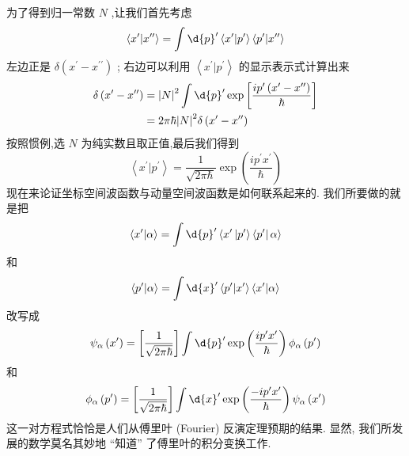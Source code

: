 为了得到归一常数 $N$ ,让我们首先考虑
\begin{equation}
	\left\langle {{x}^{\prime } | {x}^{\prime \prime }}\right\rangle = \int \d{p}^{\prime }\left\langle {{x}^{\prime } | {p}^{\prime }}\right\rangle \left\langle {{p}^{\prime } | {x}^{\prime \prime }}\right\rangle
\end{equation}
左边正是 $\delta \left( {{x}^{\prime } - {x}^{\prime \prime }}\right)$ ; 右边可以利用 $\left\langle {{x}^{\prime } | {p}^{\prime }}\right\rangle$ 的显示表示式计算出来
\begin{equation}
	\begin{aligned}
		\delta \left( {{x}^{\prime } - {x}^{\prime \prime }}\right) &= {\left| N\right| }^{2}\int \d{p}^{\prime }\exp \left\lbrack \frac{i{p}^{\prime }\left( {{x}^{\prime } - {x}^{\prime \prime }}\right) }{\hbar }\right\rbrack\\
		&= {2\pi }\hbar {\left| N\right| }^{2}\delta \left( {{x}^{\prime } - {x}^{\prime \prime }}\right)
	\end{aligned}
\end{equation}
按照惯例,选 $N$ 为纯实数且取正值,最后我们得到
\begin{equation}
	\left\langle {{x}^{\prime } | {p}^{\prime }}\right\rangle = \frac{1}{\sqrt{{2\pi }\hbar }}\exp \left( \frac{i{p}^{\prime }{x}^{\prime }}{\hbar }\right)
\end{equation}
现在来论证坐标空间波函数与动量空间波函数是如何联系起来的. 我们所要做的就是把
\begin{equation}
	\left\langle {{x}^{\prime } | \alpha }\right\rangle = \int \d{p}^{\prime }\left\langle {{x}^{\prime }\left| {p}^{\prime }\right\rangle \left\langle {p}^{\prime }\right| \alpha }\right\rangle
\end{equation}
和
\begin{equation}
	\left\langle {{p}^{\prime } | \alpha }\right\rangle = \int \d{x}^{\prime }\left\langle {{p}^{\prime } | {x}^{\prime }}\right\rangle \left\langle {{x}^{\prime } | \alpha }\right\rangle
\end{equation}
改写成
\begin{equation}
	{\psi }_{\alpha }\left( {x}^{\prime }\right) = \left\lbrack \frac{1}{\sqrt{{2\pi }\hbar }}\right\rbrack \int \d{p}^{\prime }\exp \left( \frac{i{p}^{\prime }{x}^{\prime }}{\hbar }\right) {\phi }_{\alpha }\left( {p}^{\prime }\right)
\end{equation}
和
\begin{equation}
	{\phi }_{\alpha }\left( {p}^{\prime }\right) = \left\lbrack \frac{1}{\sqrt{{2\pi }\hbar }}\right\rbrack \int \d{x}^{\prime }\exp \left( \frac{-i{p}^{\prime }{x}^{\prime }}{\hbar }\right) {\psi }_{\alpha }\left( {x}^{\prime }\right)
\end{equation}
这一对方程式恰恰是人们从傅里叶 (Fourier) 反演定理预期的结果. 显然, 我们所发展的数学莫名其妙地 “知道” 了傅里叶的积分变换工作.
